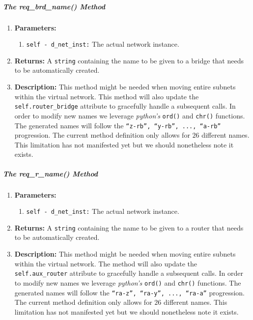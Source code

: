         \subparagraph{The req\_brd\_name() Method}
            \begin{enumerate}
                \item \textbf{Parameters:}
                \begin{enumerate}
                    \item \texttt{self - d\_net\_inst:} The actual network instance.
                \end{enumerate}
                \item \textbf{Returns:} A \texttt{string} containing the name to be given to a bridge that needs to be automatically created.
                \item \textbf{Description:} This method might be needed when moving entire subnets within the virtual network. This method will also update the \texttt{self.router\_bridge} attribute to gracefully handle a subsequent calls. In order to modify new names we leverage \textit{python's} \texttt{ord()} \cite{bib:python-builtins} and \texttt{chr()} \cite{bib:python-builtins} functions. The generated names will follow the \texttt{``z-rb'', ``y-rb'', ..., ``a-rb''} progression. The current method definition only allows for $26$ different names. This limitation has not manifested yet but we should nonetheless note it exists.
            \end{enumerate}

        \subparagraph{The req\_r\_name() Method}
            \begin{enumerate}
                \item \textbf{Parameters:}
                \begin{enumerate}
                    \item \texttt{self - d\_net\_inst:} The actual network instance.
                \end{enumerate}
                \item \textbf{Returns:} A \texttt{string} containing the name to be given to a router that needs to be automatically created.
                \item \textbf{Description:} This method might be needed when moving entire subnets within the virtual network. The method will also update the \texttt{self.aux\_router} attribute to gracefully handle a subsequent calls. In order to modify new names we leverage \textit{python's} \texttt{ord()} \cite{bib:python-builtins} and \texttt{chr()} \cite{bib:python-builtins} functions. The generated names will follow the \texttt{``ra-z'', ``ra-y'', ..., ``ra-a''} progression. The current method definition only allows for $26$ different names. This limitation has not manifested yet but we should nonetheless note it exists.
            \end{enumerate}

